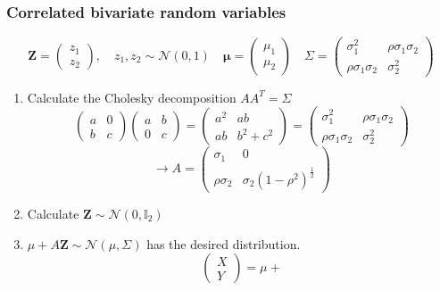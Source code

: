 \documentclass[10pt, compress]{beamer}
\begin{document}
\begin{frame}[fragile]
  \frametitle{Correlated bivariate random variables}
  \[
    \mathbf{Z} = \left(\begin{matrix} z_1 \\ z_2 \end{matrix} \right), \quad z_1, z_2 \sim \mathcal{N}(0,1)
    \quad
    \mathbf{\mu} = \left(\begin{matrix} \mu_1 \\ \mu_2 \end{matrix} \right)
    \quad
    \Sigma = \left(\begin{matrix} \sigma_1^2 & \rho\sigma_1\sigma_2 \\ \rho\sigma_1\sigma_2 & \sigma_2^2 \end{matrix} \right)
  \]
  \begin{enumerate}
    \item Calculate the Cholesky decomposition $AA^T = \Sigma$
      \[
        \left(\begin{matrix} a & 0 \\ b & c \end{matrix} \right)
        \left(\begin{matrix} a & b \\ 0 & c \end{matrix} \right) =
        \left(\begin{matrix} a^2 & ab \\ ab & b^2 + c^2 \end{matrix} \right)
        = \left(\begin{matrix} \sigma_1^2 & \rho\sigma_1\sigma_2 \\ \rho\sigma_1\sigma_2 & \sigma_2^2 \end{matrix} \right)
      \] \[
        \rightarrow A = \left(\begin{matrix} \sigma_1 & 0 \\ \rho\sigma_2 & \sigma_2(1-\rho^2)^{\frac{1}{2}} \end{matrix} \right)
      \]
    \item Calculate $\mathbf{Z} \sim\mathcal{N}(0,\mathbb{I}_2)$
    \item $\mu + A\mathbf{Z} \sim \mathcal{N}(\mu,\Sigma)$ has the desired distribution.
      \[
        \left( \begin{matrix}X \\ Y \end{matrix} \right) = 
        \mu + %
\]
\end{enumerate}
\end{frame}
\end{document}
